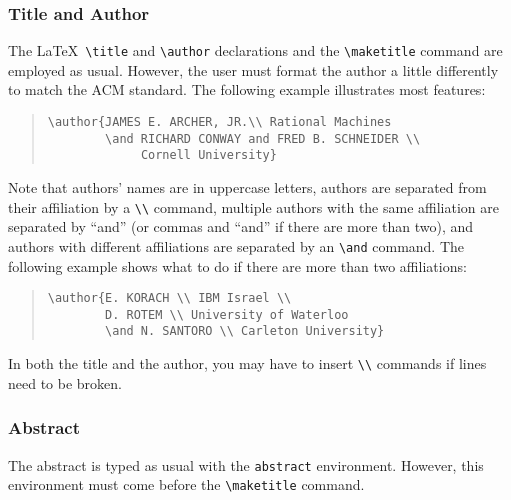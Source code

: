 \documentclass[hyperref]{acmtrans2e}
\begin{document}
\subsubsection{Title and Author}
The \LaTeX\ \verb|\title| and \verb|\author| declarations and the
\verb|\maketitle| command are employed as usual.  However, the user
must format the author a little differently to match the ACM standard.
The following example \cite{6:1:1} illustrates most features:
\begin{quote}
\begin{verbatim}
\author{JAMES E. ARCHER, JR.\\ Rational Machines
        \and RICHARD CONWAY and FRED B. SCHNEIDER \\ 
             Cornell University}
\end{verbatim}
\end{quote}
Note that authors' names are in uppercase letters, authors are
separated from their affiliation by a \verb|\\| command, multiple
authors with the same affiliation are separated by ``and'' (or commas
and ``and'' if there are more than two), and authors with different
affiliations are separated by an \verb|\and| command.  The following
example \cite{6:3:380} shows what to do if there are more than
two affiliations:
\begin{quote}
\begin{verbatim}
\author{E. KORACH \\ IBM Israel \\
        D. ROTEM \\ University of Waterloo
        \and N. SANTORO \\ Carleton University}
\end{verbatim}
\end{quote}
In both the title and the author, you may have to insert \verb|\\|
commands if lines need to be broken. 

\subsubsection{Abstract}
The abstract is typed as usual with the {\tt abstract} environment.
However, this environment must come before the \verb|\maketitle|
command.
\end{document}

